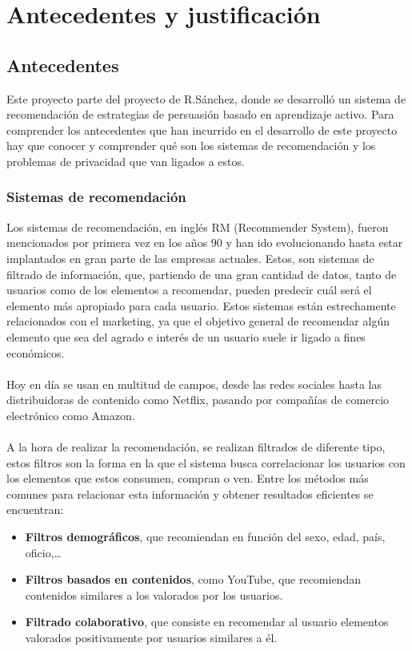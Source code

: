 \chapter{Antecedentes y justificación}
\thispagestyle{fancy}

\section{Antecedentes}
Este proyecto parte del proyecto de R.Sánchez\autocite{sanchez-corcueraPersuasionbasedRecommenderSystem2020}, donde se desarrolló un sistema de recomendación de estrategias de persuasión basado en aprendizaje activo. Para comprender los antecedentes que han incurrido en el desarrollo de este proyecto hay que conocer y comprender qué son los sistemas de recomendación y los problemas de privacidad que van ligados a estos. 
\subsection{Sistemas de recomendación}
Los sistemas de recomendación, en inglés RM (Recommender System), fueron mencionados por primera vez en los años 90 y han ido evolucionando hasta estar implantados en gran parte de las empresas actuales. Estos, son sistemas de filtrado de información, que, partiendo de una gran cantidad de datos, tanto de usuarios como de los elementos a recomendar, pueden predecir cuál será el elemento más apropiado para cada usuario. Estos sistemas están estrechamente relacionados con el marketing, ya que el objetivo general de recomendar algún elemento que sea del agrado e interés de un usuario suele ir ligado a fines económicos.
\\ \\
Hoy en día se usan en multitud de campos, desde las redes sociales hasta las distribuidoras de contenido como Netflix, pasando por compañías de comercio electrónico como Amazon. 
\\ \\
A la hora de realizar la recomendación, se realizan filtrados de diferente tipo, estos filtros son la forma en la que el sistema busca correlacionar los usuarios con los elementos que estos consumen, compran o ven. Entre los métodos más comunes para relacionar esta información y obtener resultados eficientes se encuentran:
\begin{itemize}
    \item \textbf{Filtros demográficos}, que recomiendan en función del sexo, edad, país, oficio,… 
    \item \textbf{Filtros basados en contenidos}, como YouTube, que recomiendan contenidos similares a los valorados por los usuarios. 
    \item \textbf{Filtrado colaborativo}, que consiste en recomendar al usuario elementos valorados positivamente por usuarios similares a él. 
\end{itemize}

